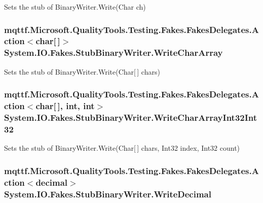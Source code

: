 Sets the stub of Binary\-Writer.\-Write(\-Char ch)

\hypertarget{class_system_1_1_i_o_1_1_fakes_1_1_stub_binary_writer_ab3af2483b57ca9a570b046ae9cc64ca0}{
\subsubsection[{Write\-Char\-Array}]{\setlength{\rightskip}{0pt plus 5cm}mqttf.\-Microsoft.\-Quality\-Tools.\-Testing.\-Fakes.\-Fakes\-Delegates.\-Action$<$char\mbox{[}$\,$\mbox{]}$>$ System.\-I\-O.\-Fakes.\-Stub\-Binary\-Writer.\-Write\-Char\-Array}}\label{class_system_1_1_i_o_1_1_fakes_1_1_stub_binary_writer_ab3af2483b57ca9a570b046ae9cc64ca0}


Sets the stub of Binary\-Writer.\-Write(\-Char\mbox{[}$\,$\mbox{]} chars)

\hypertarget{class_system_1_1_i_o_1_1_fakes_1_1_stub_binary_writer_a4b01ceacc4ee0b37624d6de2613583f7}{
\subsubsection[{Write\-Char\-Array\-Int32\-Int32}]{\setlength{\rightskip}{0pt plus 5cm}mqttf.\-Microsoft.\-Quality\-Tools.\-Testing.\-Fakes.\-Fakes\-Delegates.\-Action$<$char\mbox{[}$\,$\mbox{]}, int, int$>$ System.\-I\-O.\-Fakes.\-Stub\-Binary\-Writer.\-Write\-Char\-Array\-Int32\-Int32}}\label{class_system_1_1_i_o_1_1_fakes_1_1_stub_binary_writer_a4b01ceacc4ee0b37624d6de2613583f7}


Sets the stub of Binary\-Writer.\-Write(\-Char\mbox{[}$\,$\mbox{]} chars, Int32 index, Int32 count)

\hypertarget{class_system_1_1_i_o_1_1_fakes_1_1_stub_binary_writer_ad7c76d4a6afb9d81bafa5403e6bcf5dc}{
\subsubsection[{Write\-Decimal}]{\setlength{\rightskip}{0pt plus 5cm}mqttf.\-Microsoft.\-Quality\-Tools.\-Testing.\-Fakes.\-Fakes\-Delegates.\-Action$<$decimal$>$ System.\-I\-O.\-Fakes.\-Stub\-Binary\-Writer.\-Write\-Decimal}}\label{class_system_1_1_i_o_1_1_fakes_1_1_stub_binary_writer_ad7c76d4a6afb9d81bafa5403e6bcf5dc}


